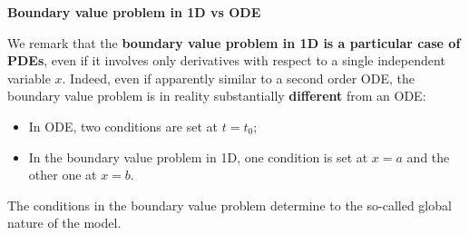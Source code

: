 \noindent
\begin{flushleft}
    \textcolor{Green3}{ \textbf{Boundary value problem in 1D vs ODE}}
\end{flushleft}
We remark that the \textbf{boundary value problem in 1D is a particular case of PDEs}, even if it involves only derivatives with respect to a single independent variable $x$. Indeed, even if apparently similar to a second order ODE, the boundary value problem is in reality substantially \textbf{different} from an ODE:
\begin{itemize}
    \item In ODE, two conditions are set at $t = t_{0}$;
    \item In the boundary value problem in 1D, one condition is set at $x = a$ and the other one at $x = b$.
\end{itemize}
The conditions in the boundary value problem determine to the so-called global nature of the model.